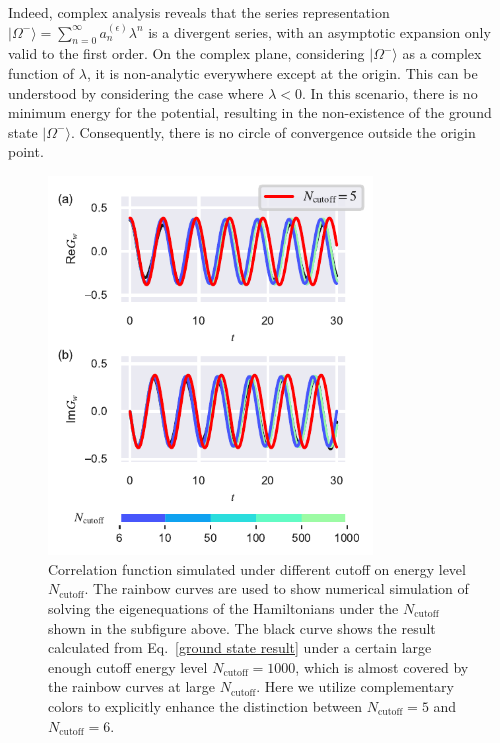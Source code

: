 \documentclass[twocolumn,pra,aps,superscriptaddress]{revtex4-2}
\begin{document}
Indeed, complex analysis reveals that the series representation $|\Omega^{-}\rangle = \sum_{n=0}^{\infty} a_n^{(\epsilon)} \lambda^n$ is a divergent series, with an asymptotic expansion only valid to the first order. On the complex plane, considering $|\Omega^{-}\rangle$ as a complex function of $\lambda$, it is non-analytic everywhere except at the origin. This can be understood by considering the case where $\lambda<0$. In this scenario, there is no minimum energy for the potential, resulting in the non-existence of the ground state $|\Omega^{-}\rangle$. Consequently, there is no circle of convergence outside the origin point.

\begin{figure} 
\includegraphics[width=8.6cm]{Fig5}
\caption{\label{S1}  Correlation function simulated under different cutoff on energy level $N_{\text{cutoff}}$. The rainbow curves are used to show numerical simulation of solving the eigenequations of the Hamiltonians under the $N_{\text{cutoff}}$ shown in the subfigure above. The black curve shows the result calculated from Eq.~\eqref{ground state result} under a certain large enough cutoff energy level $N_{\text{cutoff}}=1000$, which is almost covered by the rainbow curves at large $N_{\text{cutoff}}$. Here we utilize complementary colors to explicitly enhance the distinction between $N_{\text{cutoff}}=5$ and $N_{\text{cutoff}}=6$. 
 }
\end{figure}
\end{document}
